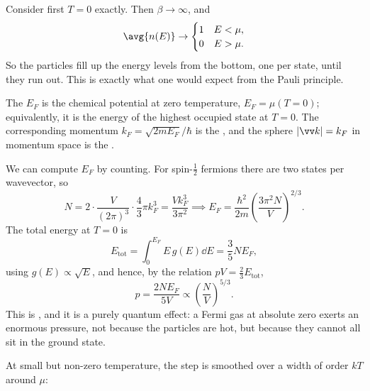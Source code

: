 Consider first $T = 0$ exactly. Then $\beta \to \infty$, and
$$
\avg{n(E)} \to \begin{cases}1 & E < \mu,\\ 0 & E > \mu.\end{cases}
$$
So the particles fill up the energy levels from the bottom, one per state, until they run out. This is exactly what one would expect from the Pauli principle.

\begin{definition}
	The  $E_F$ is the chemical potential at zero temperature, $E_F = \mu(T=0)$; equivalently, it is the energy of the highest occupied state at $T=0$. The corresponding momentum $k_F = \sqrt{2mE_F}/\hbar$ is the , and the sphere $|\vv k| = k_F$ in momentum space is the .
\end{definition}

We can compute $E_F$ by counting. For spin-$\tfrac 12$ fermions there are two states per wavevector, so
$$
N = 2\cdot\frac{V}{(2\pi)^3}\cdot\frac 43 \pi k_F^3 = \frac{Vk_F^3}{3\pi^2} \implies E_F = \frac{\hbar^2}{2m}\left(\frac{3\pi^2 N}{V}\right)^{2/3}.
$$
The total energy at $T=0$ is
$$
E_{\mathrm{tot}} = \int_0^{E_F}E\, g(E)\dd E = \frac 35 N E_F,
$$
using $g(E) \propto \sqrt E$, and hence, by the relation $pV = \tfrac 23 E_{\mathrm{tot}}$,
$$
p = \frac{2NE_F}{5V} \propto \left(\frac NV\right)^{5/3}.
$$
This is , and it is a purely quantum effect: a Fermi gas at absolute zero exerts an enormous pressure, not because the particles are hot, but because they cannot all sit in the ground state.

At small but non-zero temperature, the step is smoothed over a width of order $kT$ around $\mu$:

